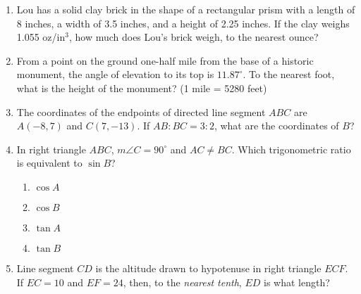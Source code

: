 \documentclass[12pt, oneside]{article}
\begin{document}
\begin{enumerate}[itemsep=1.2cm]
\newpage
\item Lou has a solid clay brick in the shape of a rectangular prism with a length of 8 inches, a width of 3.5 inches, and a height of 2.25 inches. If the clay weighs 1.055 oz/in$^3$, how much does Lou's brick weigh, to the nearest ounce?

\item From a point on the ground one-half mile from the base of a historic monument, the angle of elevation to its top is $11.87^\circ$. To the nearest foot, what is the height of the monument? (1 mile = 5280 feet)

\item The coordinates of the endpoints of directed line segment $ABC$ are $A(-8,7)$ and $C(7,-13)$. If $AB:BC = 3:2$, what are the coordinates of $B$?

\item In right triangle $ABC$, $m\angle C=90^\circ$ and $AC \ne BC$. Which trigonometric ratio is equivalent to $\sin B$?
\begin{multicols}{2}
  \begin{enumerate}
    \item $\cos A$
    \item $\cos B$
    \item $\tan A$
    \item $\tan B$
  \end{enumerate}
\end{multicols}

\item Line segment $CD$ is the altitude drawn to hypotenuse in right
triangle $ECF$. If $EC=10$ and $EF=24$, then, to the \emph{nearest
tenth}, $ED$ is what length?

\end{enumerate}
\end{document}
